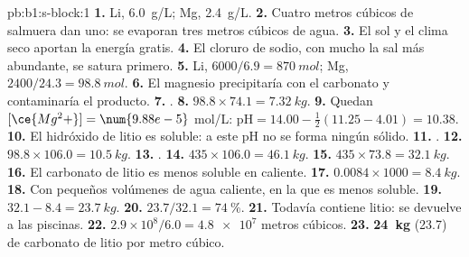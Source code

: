 \begin{solution}{pb:b1:s-block:1}
\textbf{1.} Li, \qty{6.0}{g/L}; Mg, \qty{2.4}{g/L}.
\textbf{2.} Cuatro metros cúbicos de salmuera dan uno: se evaporan tres
metros cúbicos de agua.
\textbf{3.} El sol y el clima seco aportan la energía gratis.
\textbf{4.} El cloruro de sodio, con mucho la sal más abundante, se
satura primero.
\textbf{5.} Li, $6000/6.9 = \qty{870}{mol}$; Mg, $2400/24.3 = \qty{98.8}{mol}$.
\textbf{6.} El magnesio precipitaría con el carbonato y contaminaría el
producto.
\textbf{7.} .
\textbf{8.} $98.8 \times 74.1 = \qty{7.32}{kg}$.
\textbf{9.} Quedan $[\ce{Mg^2+}] = \num{9.88e-5}$ mol/L: $\mathrm{pH} = 14.00 -
\frac12(11.25 - 4.01) = 10.38$.
\textbf{10.} El hidróxido de litio es soluble: a este pH no se forma
ningún sólido.
\textbf{11.} .
\textbf{12.} $98.8 \times 106.0 = \qty{10.5}{kg}$.
\textbf{13.} .
\textbf{14.} $435 \times 106.0 = \qty{46.1}{kg}$.
\textbf{15.} $435 \times 73.8 = \qty{32.1}{kg}$.
\textbf{16.} El carbonato de litio es menos soluble en caliente.
\textbf{17.} $0.0084 \times 1000 = \qty{8.4}{kg}$.
\textbf{18.} Con pequeños volúmenes de agua caliente, en la que es menos
soluble.
\textbf{19.} $32.1 - 8.4 = \qty{23.7}{kg}$.
\textbf{20.} $23.7/32.1 = \qty{74}{\percent}$.
\textbf{21.} Todavía contiene litio: se devuelve a las piscinas.
\textbf{22.} $2.9 \times 10^8/6.0 = \num{4.8e7}$ metros cúbicos.
\textbf{23.} \textbf{\qty{24}{kg}} (23.7) de carbonato de litio por metro
cúbico.
\end{solution}
